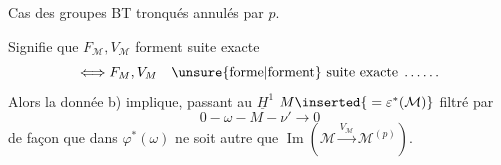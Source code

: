 Cas des groupes BT tronqués annulés par $p$.

Signifie que $F_{\mathcal M},V_{\mathcal M}$ forment suite exacte
\[
\Longleftrightarrow F_M,V_M\quad\text{\unsure{forme|forment} suite exacte}\;\ldots\ldots
\]
Alors la donnée b) implique, passant au $\underline H^1$
$M\inserted{{}=\varepsilon^*(\mathcal M)}$ filtré par
\[
0\mathbin{-}\omega\mathbin{-}M\mathbin{-}\nu'\longrightarrow0
\]
de façon que dans
$\varphi^*(\omega)$ ne soit autre que $\operatorname{Im}(\mathcal M\xrightarrow{V_{\mathcal M}}\mathcal M^{(p)})$.

